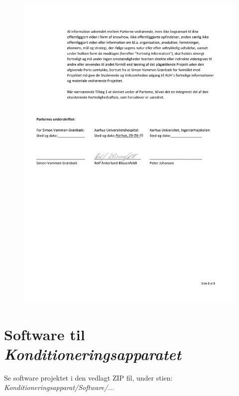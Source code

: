 \begin{figure}[H]
	\includegraphics[width = 1\textwidth]{billeder/FortrolighedsaftalePersonligSide2.pdf}
\end{figure}

\section{Software til \textit{Konditioneringsapparatet}}
Se software projektet i den vedlagt ZIP fil, under stien: \textit{Konditioneringsapparat/Software/...}

